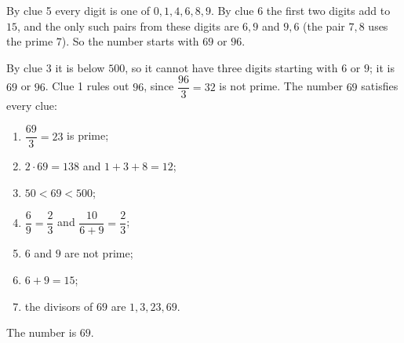 By clue 5 every digit is one of $0,1,4,6,8,9$. By clue 6 the first two digits add to $15$, and the only such pairs from these digits are $6,9$ and $9,6$ (the pair $7,8$ uses the prime $7$). So the number starts with $69$ or $96$.

By clue 3 it is below $500$, so it cannot have three digits starting with $6$ or $9$; it is $69$ or $96$. Clue 1 rules out $96$, since $\dfrac{96}{3}=32$ is not prime. The number $69$ satisfies every clue:
\begin{enumerate}
\item $\dfrac{69}{3}=23$ is prime;
\item $2\cdot69=138$ and $1+3+8=12$;
\item $50<69<500$;
\item $\dfrac{6}{9}=\dfrac{2}{3}$ and $\dfrac{10}{6+9}=\dfrac{2}{3}$;
\item $6$ and $9$ are not prime;
\item $6+9=15$;
\item the divisors of $69$ are $1,3,23,69$.
\end{enumerate}
The number is $\boxed{69}$.
